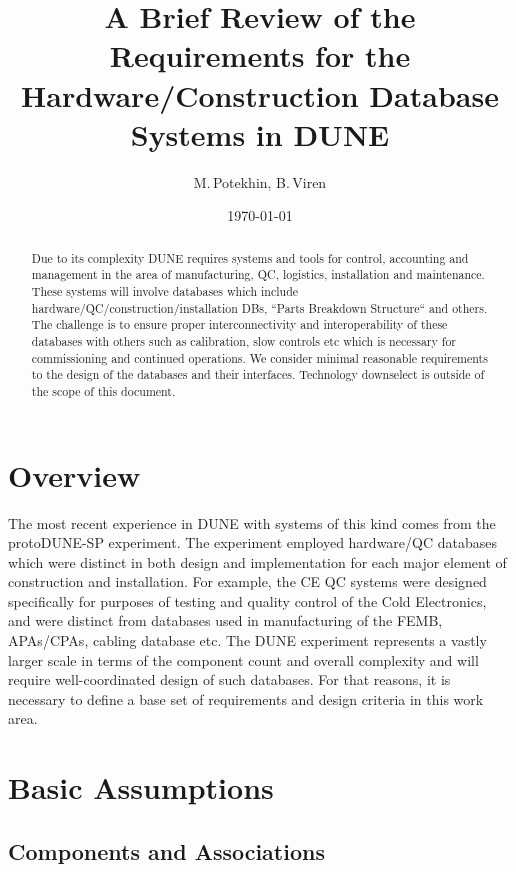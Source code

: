 \documentclass[pdftex,12pt,letter]{article}
\title{A Brief Review of the Requirements for the Hardware/Construction Database Systems in DUNE}
\date{\today}
\author{M.\,Potekhin, B.\,Viren}
\begin{document}
\maketitle

\begin{abstract}
\noindent  Due to its complexity DUNE requires systems and tools for control, accounting and
management in the area of manufacturing, QC, logistics, installation and maintenance. These systems
will involve databases which include hardware/QC/construction/installation DBs,
``Parts Breakdown Structure`` and others. The challenge is to ensure proper
interconnectivity and interoperability of these databases with others such as calibration,
slow controls etc which is necessary for commissioning and continued
operations. We consider minimal reasonable requirements to the design of the databases
and their interfaces. Technology downselect is outside of the scope of this document.

\end{abstract}


\section{Overview}

The most recent experience in DUNE with systems of this kind comes from the protoDUNE-SP experiment.
The experiment employed hardware/QC databases which were distinct in both
design and implementation for each major element of construction and installation. For example, the CE QC
systems were designed specifically for purposes of testing and quality control of the Cold Electronics,
and were distinct from databases used in manufacturing of the FEMB, APAs/CPAs, cabling database etc.
The DUNE experiment represents a vastly larger scale in terms of the component count and
overall complexity and will require well-coordinated design of such databases. For that reasons,
it is necessary to define a base set of requirements and design criteria in this work area.

\section{Basic Assumptions}
\subsection{Components and Associations}
\end{document}
